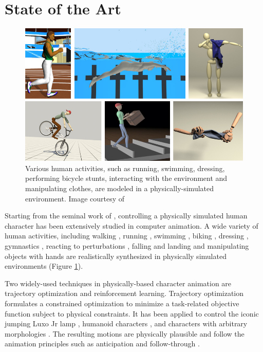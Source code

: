 \section{State of the Art}

\begin{figure}[h]
  \centering
  \includegraphics[width=\textwidth]{figures/teaser2.jpg}
  \caption{Various human activities, such as running, swimming, dressing, performing bicycle stunts, interacting with the environment and manipulating clothes, are modeled in a physically-simulated environment. Image courtesy of \cite{Hodgins:1995:AHA,Si:2014,Clegg:2015,Tan:2014,Coros2010,Bai:2014}}
  \label{fig:teaser}
\end{figure}

Starting from the seminal work of \citet{Hodgins:1995:AHA}, controlling a physically simulated human character has been extensively studied in computer animation. A wide variety of human activities, including walking \cite{Yin:2007}, running \cite{Kwon:2010}, swimming \cite{kwatra2009fluid,Si:2014}, biking \cite{Tan:2014}, dressing \cite{Clegg:2015}, gymnastics \cite{Hodgins:1995:AHA}, reacting to perturbations \cite{Wang:2010}, falling and landing \cite{HA:2012:FLM} and manipulating objects with hands \cite{Liu:2009:DMF,Ye:2012,Bai:2014} are realistically synthesized in physically simulated environments (Figure \ref{fig:teaser}). 

Two widely-used techniques in physically-based character animation are trajectory optimization and reinforcement learning. Trajectory optimization formulates a constrained optimization to minimize a task-related objective function subject to physical constraints. It has been applied to control the iconic jumping Luxo Jr lamp \cite{Witkin:1988}, humanoid characters \cite{Liu:2002,Jain:2009,Ye:2010}, and characters with arbitrary morphologies \cite{Wampler:2009}. The resulting motions are physically plausible and follow the animation principles such as anticipation and follow-through \cite{thomas:1995}.

